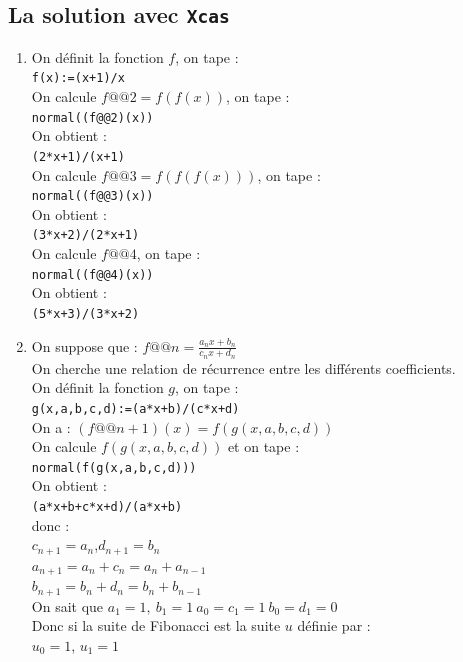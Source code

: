 \documentclass[a4paper,11pt]{book}
\begin{document}
\subsection{La solution avec {\tt Xcas}}
\begin{enumerate}
\item On d\'efinit la fonction $f$, on tape :\\
{\tt f(x):=(x+1)/x}\\
On calcule $f@@ 2=f(f(x))$, on tape :\\
{\tt normal((f@@2)(x))}\\
On obtient :\\
{\tt (2*x+1)/(x+1)}\\
 On calcule $f@@ 3=f(f(f(x)))$, on tape :\\
{\tt normal((f@@3)(x))}\\
On obtient :\\
{\tt (3*x+2)/(2*x+1)}\\
On calcule $f@@ 4$, on tape :\\
{\tt normal((f@@4)(x))}\\
On obtient :\\
{\tt (5*x+3)/(3*x+2)}\\
\item On suppose que :
$\displaystyle f@@ n=\frac{a_nx+b_n}{c_nx+d_n}$\\
On cherche une relation de r\'ecurrence entre les diff\'erents coefficients.\\
On d\'efinit la fonction $g$, on tape :\\
{\tt g(x,a,b,c,d):=(a*x+b)/(c*x+d)}\\
On a :
$(f@@ n+1)(x)=f(g(x,a,b,c,d))$\\
 On calcule $f(g(x,a,b,c,d))$ et on tape :\\
{\tt normal(f(g(x,a,b,c,d)))}\\
On obtient :\\
{\tt (a*x+b+c*x+d)/(a*x+b)}\\
donc :\\
$c_{n+1}=a_n$,\hspace*{0.5cm}$d_{n+1}=b_n$\\
$a_{n+1}=a_n+c_n=a_n+a_{n-1}$\\
$b_{n+1}=b_n+d_n=b_n+b_{n-1}$\\
On sait que $a_1=1,\ b_1=1\ a_0=c_1=1\ b_0=d_1=0$\\
Donc si la suite de Fibonacci est la suite $u$ d\'efinie par :\\
$u_0=1$,\hspace*{0.5cm} $u_1=1$\\

\end{enumerate}
\end{document}
